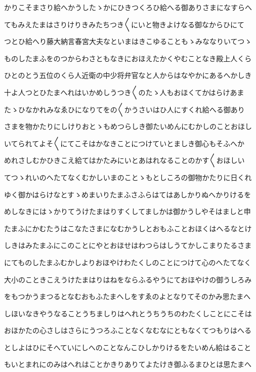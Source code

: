 \documentclass[a4paper,11pt,landscape]{ltjtarticle}
\begin{document}
かりこそまさり給へかうしたゝかにひきつくろひ給へる御ありさまになすらへ
\par\medskip
てもみえたまはさりけりきみたちつき〱にいと物きよけなる御なからひにて
\par\medskip
つとひ給へり藤大納言春宮大夫なといまはきこゆることもゝみななりいてつゝ
\par\medskip
ものしたまふをのつからわさともなきにおほえたかくやむことなき殿上人くら
\par\medskip
ひとのとう五位のくら人近衛の中少将弁官なと人からはなやかにあるへかしき
\par\medskip
十よ人つとひたまへれはいかめしうつき〱のたゝ人もおほくてかはらけあま
\par\medskip
たゝひなかれみなゑひになりてをの〱かうさいはひ人にすくれ給へる御あり
\par\medskip
さまを物かたりにしけりおとゝもめつらしき御たいめんにむかしのことおほし
\par\medskip
いてられてよそ〱にてこそはかなきことにつけていとましき御心もそふへか
\par\medskip
めれさしむかひきこえ給てはかたみにいとあはれなることのかす〱おほしい
\par\medskip
てつゝれいのへたてなくむかしいまのことゝもとしころの御物かたりに日くれ
\par\medskip
ゆく御かはらけなとすゝめまいりたまふさふらはてはあしかりぬへかりけるを
\par\medskip
めしなきにはゝかりてうけたまはりすくしてましかは御かうしやそはましと申
\par\medskip
たまふにかむたうはこなたさまになむかうしとおもふことおほくはへるなとけ
\par\medskip
しきはみたまふにこのことにやとおほせはわつらはしうてかしこまりたるさま
\par\medskip
にてものしたまふむかしよりおほやけわたくしのことにつけて心のへたてなく
\par\medskip
大小のこときこえうけたまはりはねをならふるやうにておほやけの御うしろみ
\par\medskip
をもつかうまつるとなむおもふたまへしをすゑのよとなりてそのかみ思たまへ
\par\medskip
しほいなきやうなることうちましりはへれとうちうちのわたくしことにこそは
\par\medskip
おほかたの心さしはさらにうつろふことなくなむなにともなくてつもりはへる
\par\medskip
としよはひにそへていにしへのことなんこひしかりけるをたいめん給はること
\par\medskip
もいとまれにのみはへれはことかきりありてよたけき御ふるまひとは思たまへ
\end{document}
